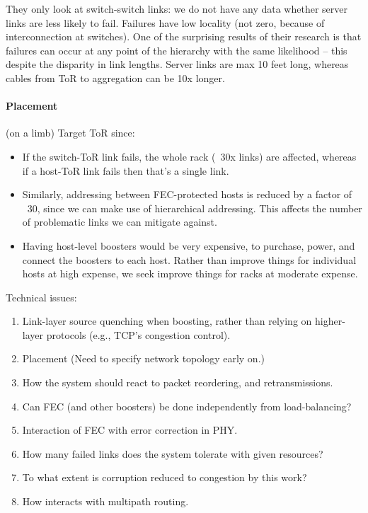 \documentclass[sigconf]{acmart}
\begin{document}
They only look at switch-switch links: we do not have any data whether server
links are less likely to fail. Failures have low locality (not zero, because
of interconnection at switches). One of the surprising results of their
research is that failures can occur at any point of the hierarchy with the
same likelihood -- this despite the disparity in link lengths. Server links
are max 10 feet long, whereas cables from ToR to aggregation can be 10x
longer.

\paragraph{Placement} (on a limb) Target ToR since:
\begin{itemize}
  \item If the switch-ToR link fails, the whole rack (~30x links) are
    affected, whereas if a host-ToR link fails then that's a single link.
  \item Similarly, addressing between FEC-protected hosts is reduced by a
    factor of ~30, since we can make use of hierarchical addressing. This
    affects the number of problematic links we can mitigate against.
  \item Having host-level boosters would be very expensive, to purchase, power, and connect the boosters to each host. Rather than improve things for individual hosts at high expense, we seek improve things for racks at moderate expense.
\end{itemize}


Technical issues:
\begin{enumerate}
  \item Link-layer source quenching when boosting, rather than relying on higher-layer protocols (e.g., TCP's congestion control).
  \item Placement (Need to specify network topology early on.)
  \item How the system should react to packet reordering, and retransmissions.
  \item Can FEC (and other boosters) be done independently from load-balancing?
  \item Interaction of FEC with error correction in PHY.
  \item How many failed links does the system tolerate with given resources?
  \item To what extent is corruption reduced to congestion by this work?
  \item How interacts with multipath routing.
\end{enumerate}
\end{document}
